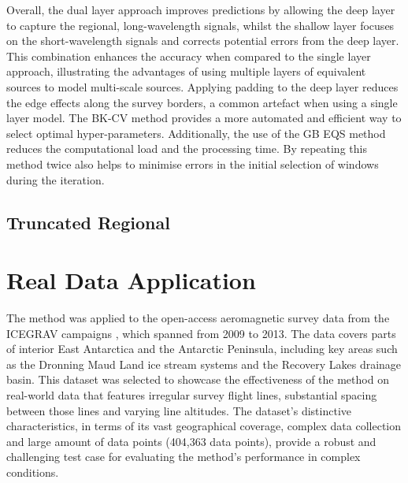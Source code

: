 Overall, the dual layer approach improves predictions by allowing the deep layer to capture the regional, long-wavelength signals, whilst the shallow layer focuses on the short-wavelength signals and corrects potential errors from the deep layer. This combination enhances the accuracy when compared to the single layer approach, illustrating the advantages of using multiple layers of equivalent sources to model multi-scale sources. Applying padding to the deep layer reduces the edge effects along the survey borders, a common artefact when using a single layer model. The BK-CV method provides a more automated and efficient way to select optimal hyper-parameters. Additionally, the use of the GB EQS method reduces the computational load and the processing time. By repeating this method twice also helps to minimise errors in the initial selection of windows during the iteration.


\subsection{Truncated Regional}
\label{sec:truncated_regional}


\section{Real Data Application}
\label{sec:real_application}

The method was applied to the open-access aeromagnetic survey data from the ICEGRAV campaigns \citep{ICEGRAV_data}, which spanned from 2009 to 2013. The data covers parts of interior East Antarctica and the Antarctic Peninsula, including key areas such as the Dronning Maud Land ice stream systems and the Recovery Lakes drainage basin. This dataset was selected to showcase the effectiveness of the method on real-world data that features irregular survey flight lines, substantial spacing between those lines and varying line altitudes. The dataset’s distinctive characteristics, in terms of its vast geographical coverage, complex data collection and large amount of data points (404,363 data points), provide a robust and challenging test case for evaluating the method's performance in complex conditions.

